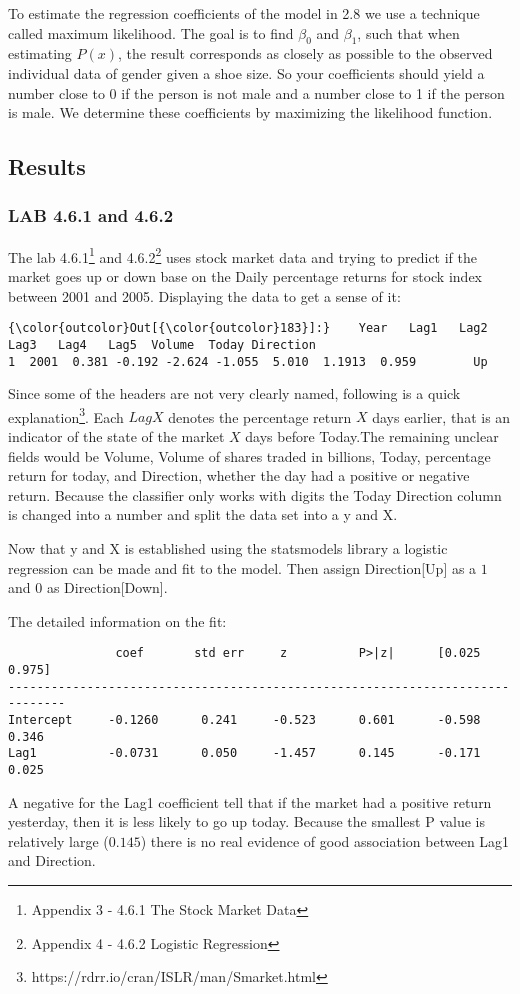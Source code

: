 To estimate the regression coefficients of the model in 2.8 we use a technique called maximum likelihood. The goal is to find $\beta_0$ and $\beta_1$, such that when estimating $P(x)$, the result corresponds as closely as possible to the observed individual data of gender given a shoe size. So your coefficients should yield a number close to 0 if the person is not male and a number close to 1 if the person is male. We determine these coefficients by maximizing the likelihood function.


\subsection{Results}
\subsubsection*{LAB 4.6.1 and 4.6.2}
The lab 4.6.1\footnote{Appendix 3 - 4.6.1 The Stock Market Data} and 4.6.2\footnote{Appendix 4 - 4.6.2 Logistic Regression} uses stock market data and trying to predict if the market goes up or down base on the Daily percentage returns for stock index between 2001 and 2005.
Displaying the data to get a sense of it:
\begin{Verbatim}[commandchars=\\\{\}]
{\color{outcolor}Out[{\color{outcolor}183}]:}    Year   Lag1   Lag2   Lag3   Lag4   Lag5  Volume  Today Direction
1  2001  0.381 -0.192 -2.624 -1.055  5.010  1.1913  0.959        Up
\end{Verbatim}
Since some of the headers are not very clearly named, following is a quick explanation\footnote{https://rdrr.io/cran/ISLR/man/Smarket.html}. Each $LagX$ denotes the percentage return $X$ days earlier, that is an indicator of the state of the market $X$ days before Today.The remaining unclear fields would be Volume, Volume of shares traded in billions, Today, percentage return for today, and Direction, whether the day had a positive or negative return. Because the classifier only works with digits the Today Direction column is changed into a number and split the data set into a y and X.

Now that y and X is established using the statsmodels library a logistic regression can be made and fit to the model. Then assign Direction[Up] as a $1$ and $0$ as Direction[Down].

The detailed information on the fit:
\begin{lstlisting}
               coef       std err     z          P>|z|      [0.025      0.975]
------------------------------------------------------------------------------
Intercept     -0.1260      0.241     -0.523      0.601      -0.598       0.346
Lag1          -0.0731      0.050     -1.457      0.145      -0.171       0.025
\end{lstlisting}
A negative for the Lag1 coefficient tell that if the market had a positive return yesterday, then it is less likely to go up today. Because the smallest P value is relatively large ($0.145$) there is no real evidence of good association between Lag1 and Direction.

